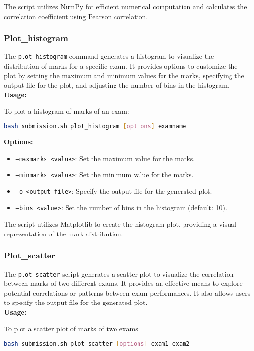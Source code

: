 \documentclass{article}
\begin{document}
The script utilizes NumPy for efficient numerical computation and calculates the correlation coefficient using Pearson correlation.

\subsubsection{Plot\_histogram}
The \texttt{plot\_histogram} command generates a histogram to visualize the distribution of marks for a specific exam. It provides options to customize the plot by setting the maximum and minimum values for the marks, specifying the output file for the plot, and adjusting the number of bins in the histogram.\\
\textbf{Usage:}
\begin{adjustwidth}{0.5cm}{0cm}
To plot a histogram of marks of an exam:
\begin{lstlisting}[language=bash]
bash submission.sh plot_histogram [options] examname
\end{lstlisting}
\end{adjustwidth}

\textbf{Options:}
\begin{itemize}
    \item \texttt{--maxmarks <value>}: Set the maximum value for the marks.
    \item \texttt{--minmarks <value>}: Set the minimum value for the marks.
    \item \texttt{-o <output\_file>}: Specify the output file for the generated plot.
    \item \texttt{--bins <value>}: Set the number of bins in the histogram (default: 10).
\end{itemize}

The script utilizes Matplotlib to create the histogram plot, providing a visual representation of the mark distribution. 

\subsubsection{Plot\_scatter}
The \texttt{plot\_scatter} script generates a scatter plot to visualize the correlation between marks of two different exams. It provides an effective means to explore potential correlations or patterns between exam performances. It also allows users to specify the output file for the generated plot.\\
\textbf{Usage:}
\begin{adjustwidth}{0.5cm}{0cm}
To plot a scatter plot of marks of two exams:
\begin{lstlisting}[language=bash]
bash submission.sh plot_scatter [options] exam1 exam2
\end{lstlisting}
\end{adjustwidth}
\end{document}

